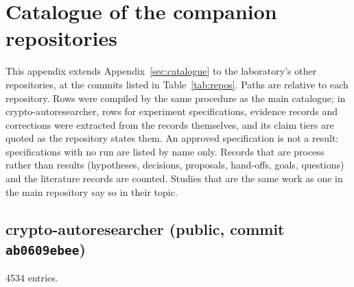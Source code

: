 \section{Catalogue of the companion repositories}\label{sec:companion-catalogue}

This appendix extends Appendix~\ref{sec:catalogue} to the laboratory's other repositories, at the commits listed in Table~\ref{tab:repos}. Paths are relative to each repository. Rows were compiled by the same procedure as the main catalogue; in crypto-autoresearcher, rows for experiment specifications, evidence records and corrections were extracted from the records themselves, and its claim tiers are quoted as the repository states them. An approved specification is not a result: specifications with no run are listed by name only. Records that are process rather than results (hypotheses, decisions, proposals, hand-offs, goals, questions) and the literature records are counted. Studies that are the same work as one in the main repository say so in their topic.

\subsection{crypto-autoresearcher (public, commit \texttt{ab0609ebee})}
4534 entries.
